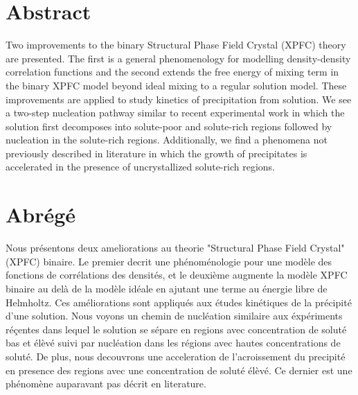 \section*{Abstract}
\label{sec:abstract}

Two improvements to the binary Structural Phase Field Crystal (XPFC) theory are
presented. The first is a general phenomenology for modelling density-density
correlation functions and the second extends the free energy of mixing term in
the binary XPFC model beyond ideal mixing to a regular solution model. These
improvements are applied to study kinetics of precipitation from solution. We
see a two-step nucleation pathway similar to recent experimental work
\cite{LOH17, WALLACE13} in which the solution first decomposes into solute-poor
and solute-rich regions followed by nucleation in the solute-rich regions.
Additionally, we find a phenomena not previously described in literature in
which the growth of precipitates is accelerated in the presence of
uncrystallized solute-rich regions.

\clearpage

\section*{Abrégé}
\label{sec:abrege}

Nous présentons deux ameliorations au theorie "Structural Phase Field Crystal"
(XPFC) binaire. Le premier decrit une phénoménologie pour une modèle des
fonctions de corrélations des densités, et le deuxième augmente la modèle XPFC
binaire au delà de la modèle idéale en ajutant une terme au énergie libre de
Helmholtz. Ces améliorations sont appliqués aux études kinétiques de la
précipité d'une solution. Nous voyons un chemin de nucléation similaire aux
éxpériments réçentes \cite{LOH17, WALLACE13} dans lequel le solution se sépare
en regions avec concentration de soluté bas et élèvé suivi par nucléation dans
les régions avec hautes concentrations de soluté. De plus, nous decouvrons une
acceleration de l'acroissement du precipité en presence des regions avec une
concentration de soluté élèvé. Ce dernier est une phénomène auparavant pas
décrit en literature. 
